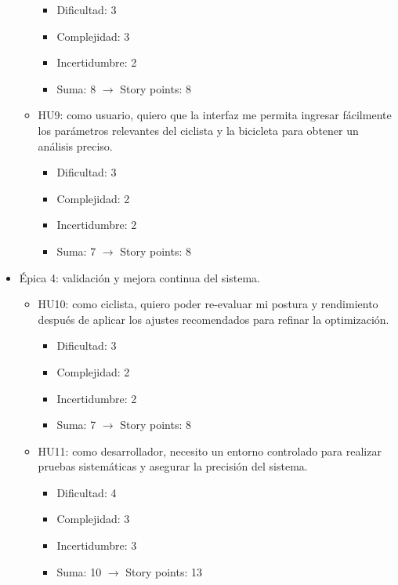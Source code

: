 \documentclass[
11pt, %
]{charter}
\begin{document}
\begin{itemize}
\begin{itemize}
        \begin{itemize}
          \item Dificultad: 3
          \item Complejidad: 3
          \item Incertidumbre: 2
          \item Suma: 8 $\rightarrow$ Story points: 8
        \end{itemize}
      \item HU9: como usuario, quiero que la interfaz me permita ingresar fácilmente los parámetros relevantes del ciclista y la bicicleta para obtener un análisis preciso.
        \begin{itemize}
          \item Dificultad: 3
          \item Complejidad: 2
          \item Incertidumbre: 2
          \item Suma: 7 $\rightarrow$ Story points: 8
        \end{itemize}
    \end{itemize}
  \item Épica 4: validación y mejora continua del sistema.
    \begin{itemize}
      \item HU10: como ciclista, quiero poder re-evaluar mi postura y rendimiento después de aplicar los ajustes recomendados para refinar la optimización.
        \begin{itemize}
          \item Dificultad: 3
          \item Complejidad: 2
          \item Incertidumbre: 2
          \item Suma: 7 $\rightarrow$ Story points: 8
        \end{itemize}
      \item HU11: como desarrollador, necesito un entorno controlado para realizar pruebas sistemáticas y asegurar la precisión del sistema.
        \begin{itemize}
          \item Dificultad: 4
          \item Complejidad: 3
          \item Incertidumbre: 3
          \item Suma: 10 $\rightarrow$ Story points: 13
        \end{itemize}
    \end{itemize}
\end{itemize}
\end{document}

